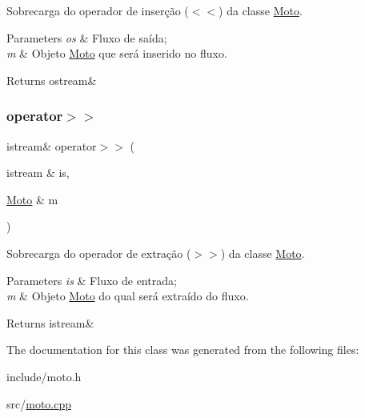 Sobrecarga do operador de inserção ($<$$<$) da classe \hyperlink{classMoto}{Moto}. 


\begin{DoxyParams}{Parameters}
{\em os} & Fluxo de saída; \\
\hline
{\em m} & Objeto \hyperlink{classMoto}{Moto} que será inserido no fluxo. \\
\hline
\end{DoxyParams}
\begin{DoxyReturn}{Returns}
ostream\& 
\end{DoxyReturn}
\mbox{\label{classMoto_ad3715e85f4df49a0e667ba8688afd7cd}} 
\subsubsection{\texorpdfstring{operator$>$$>$}{operator>>}}
{\footnotesize\ttfamily istream\& operator$>$$>$ (\begin{DoxyParamCaption}\item[{istream \&}]{is,  }\item[{\hyperlink{classMoto}{Moto} \&}]{m }\end{DoxyParamCaption})\hspace{0.3cm}{\ttfamily [friend]}}



Sobrecarga do operador de extração ($>$$>$) da classe \hyperlink{classMoto}{Moto}. 


\begin{DoxyParams}{Parameters}
{\em is} & Fluxo de entrada; \\
\hline
{\em m} & Objeto \hyperlink{classMoto}{Moto} do qual será extraído do fluxo. \\
\hline
\end{DoxyParams}
\begin{DoxyReturn}{Returns}
istream\& 
\end{DoxyReturn}


The documentation for this class was generated from the following files\+:\begin{DoxyCompactItemize}
\item 
include/moto.\+h\item 
src/\hyperlink{moto_8cpp}{moto.\+cpp}\end{DoxyCompactItemize}
